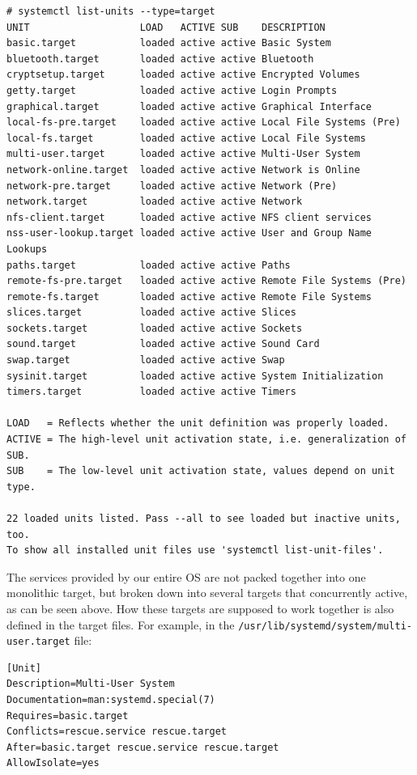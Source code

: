 \vspace{-15pt}
\begin{verbatim}
# systemctl list-units --type=target
UNIT                   LOAD   ACTIVE SUB    DESCRIPTION
basic.target           loaded active active Basic System
bluetooth.target       loaded active active Bluetooth
cryptsetup.target      loaded active active Encrypted Volumes
getty.target           loaded active active Login Prompts
graphical.target       loaded active active Graphical Interface
local-fs-pre.target    loaded active active Local File Systems (Pre)
local-fs.target        loaded active active Local File Systems
multi-user.target      loaded active active Multi-User System
network-online.target  loaded active active Network is Online
network-pre.target     loaded active active Network (Pre)
network.target         loaded active active Network
nfs-client.target      loaded active active NFS client services
nss-user-lookup.target loaded active active User and Group Name Lookups
paths.target           loaded active active Paths
remote-fs-pre.target   loaded active active Remote File Systems (Pre)
remote-fs.target       loaded active active Remote File Systems
slices.target          loaded active active Slices
sockets.target         loaded active active Sockets
sound.target           loaded active active Sound Card
swap.target            loaded active active Swap
sysinit.target         loaded active active System Initialization
timers.target          loaded active active Timers

LOAD   = Reflects whether the unit definition was properly loaded.
ACTIVE = The high-level unit activation state, i.e. generalization of SUB.
SUB    = The low-level unit activation state, values depend on unit type.

22 loaded units listed. Pass --all to see loaded but inactive units, too.
To show all installed unit files use 'systemctl list-unit-files'.
\end{verbatim}
\vspace{-10pt}

\noindent
The services provided by our entire OS are not packed together into one monolithic target, but broken down into several targets that concurrently active, as can be seen above. How these targets are supposed to work together is also defined in the target files. For example, in the \verb|/usr/lib/systemd/system/multi-user.target| file:

\vspace{-15pt}
\begin{verbatim}
[Unit]
Description=Multi-User System
Documentation=man:systemd.special(7)
Requires=basic.target
Conflicts=rescue.service rescue.target
After=basic.target rescue.service rescue.target
AllowIsolate=yes
\end{verbatim}
\vspace{-10pt}

